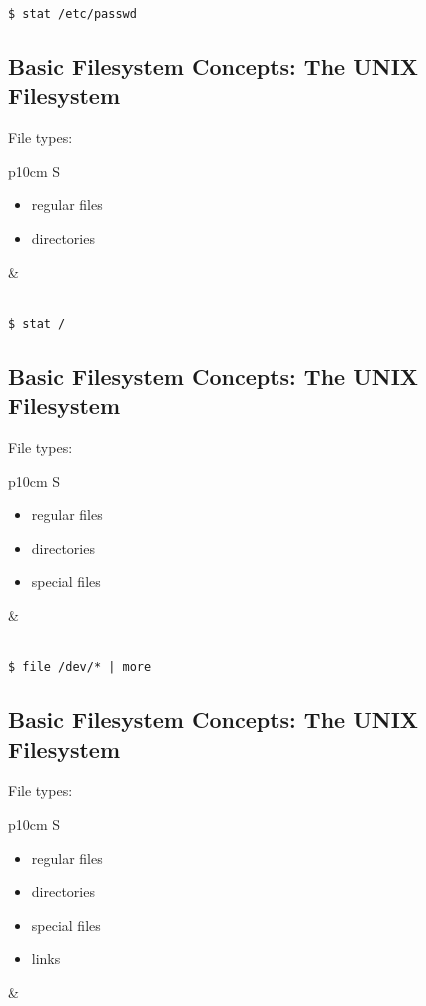 \documentclass[xga]{xdvislides}
\begin{document}
\verb+$ stat /etc/passwd+


\subsection{Basic Filesystem Concepts: The UNIX Filesystem}
File types:
\\

\begin{tabular}{ p{10cm} S }
\begin{itemize}
	\item regular files
	\item directories
\end{itemize}
&  \\
\end{tabular}
\\

\verb+$ stat /+

\subsection{Basic Filesystem Concepts: The UNIX Filesystem}
File types:
\\

\begin{tabular}{ p{10cm} S }
\begin{itemize}
	\item regular files
	\item directories
	\item special files
\end{itemize}
&  \\
\end{tabular}
\\

\verb+$ file /dev/* | more+

\subsection{Basic Filesystem Concepts: The UNIX Filesystem}
File types:
\\

\begin{tabular}{ p{10cm} S }
\begin{itemize}
	\item regular files
	\item directories
	\item special files
	\item links
\end{itemize}
&  \\
\end{tabular}
\\
\end{document}
